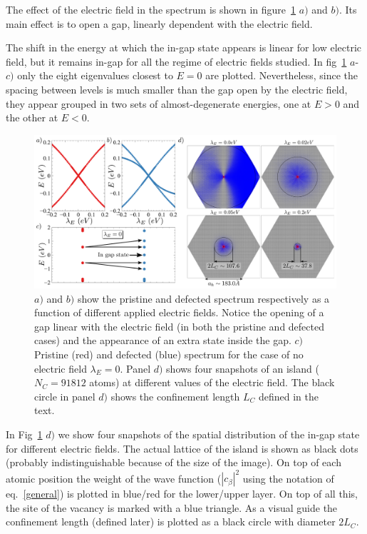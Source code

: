 The effect of the electric field in the spectrum is shown in figure~\ref{1vac_spec} $a)$ and $b)$. Its main effect is to open a gap, linearly dependent with the electric field.

The shift in the energy at which the in-gap state appears is linear for low electric field, but it remains in-gap for all the regime of electric fields studied. In fig~\ref{1vac_spec} $a$-$c)$ only the eight eigenvalues closest to $E=0$ are plotted. Nevertheless, since the spacing between levels is much smaller than the gap open by the electric field, they appear grouped in two sets of almost-degenerate energies, one at $E>0$ and the other at $E<0$.\\

\begin{figure}[!ht!]
\centering
\includegraphics[width=\textwidth]{chapter06/figures/single_vac_spectrum.pdf}
\vspace{-15pt}
\caption{$a)$ and $b)$ show the pristine and defected spectrum respectively as a function of different applied electric fields. Notice the opening of a gap linear with the electric field (in both the pristine and defected cases) and the appearance of an extra state inside the gap. $c)$ Pristine (red) and defected (blue) spectrum for the case of no electric field $\lambda_E=0$. Panel $d)$ shows four snapshots of an island ($N_C=91812$ atoms) at different values of the electric field. The black circle in panel $d)$ shows the confinement length $L_C$ defined in the text.}
\label{1vac_spec}
\end{figure}
\FloatBarrier

In Fig~\ref{1vac_spec} $d)$ we show four snapshots of the spatial distribution of the in-gap state for different electric fields. The actual lattice of the island is shown as black dots (probably indistinguishable because of the size of the image).
On top of each atomic position the weight of the wave function ($|c_\beta|^2$ using the notation of eq.~\eqref{general}) is plotted in blue/red for the lower/upper layer.
On top of all this, the site of the vacancy is marked with a blue triangle.
As a visual guide the confinement length (defined later) is plotted as a black circle with diameter $2L_C$.\\

